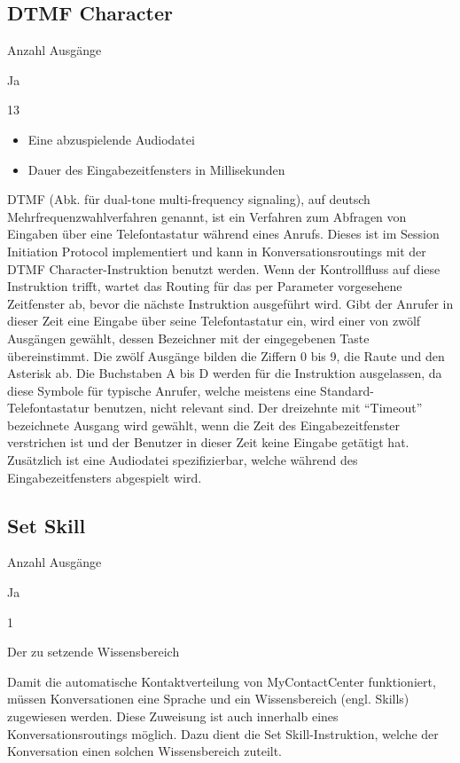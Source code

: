 \subsection{DTMF Character}
\begin{labeling}{Anzahl Ausgänge}
\item [Eingang] Ja
\item [Anzahl Ausgänge] 13
\item [Parameter] \begin{itemize} \item Eine abzuspielende Audiodatei  \item Dauer des Eingabezeitfensters in Millisekunden \end{itemize}
\item [Beschreibung] DTMF (Abk. für dual-tone multi-frequency signaling), auf deutsch Mehrfrequenzwahlverfahren genannt, ist ein Verfahren zum Abfragen von Eingaben über eine Telefontastatur während eines Anrufs. Dieses ist im Session Initiation Protocol implementiert und kann in Konversationsroutings mit der DTMF Character-Instruktion benutzt werden. Wenn der Kontrollfluss auf diese Instruktion trifft, wartet das Routing für das per Parameter vorgesehene Zeitfenster ab, bevor die nächste Instruktion ausgeführt wird. Gibt der Anrufer in dieser Zeit eine Eingabe über seine Telefontastatur ein, wird einer von zwölf Ausgängen gewählt, dessen Bezeichner mit der eingegebenen Taste übereinstimmt. Die zwölf Ausgänge bilden die Ziffern 0 bis 9, die Raute und den Asterisk ab. Die Buchstaben A bis D werden für die Instruktion ausgelassen, da diese Symbole für typische Anrufer, welche meistens eine Standard-Telefontastatur benutzen, nicht relevant sind. Der dreizehnte mit ``Timeout'' bezeichnete Ausgang wird gewählt, wenn die Zeit des Eingabezeitfenster verstrichen ist und der Benutzer in dieser Zeit keine Eingabe getätigt hat. Zusätzlich ist eine Audiodatei spezifizierbar, welche während des Eingabezeitfensters abgespielt wird.  
\end{labeling}

\subsection{Set Skill}
\label{subsec:Set Skill}
\begin{labeling}{Anzahl Ausgänge}
\item [Eingang] Ja
\item [Anzahl Ausgänge] 1
\item [Parameter] Der zu setzende Wissensbereich
\item [Beschreibung] Damit die automatische Kontaktverteilung von MyContactCenter funktioniert, müssen Konversationen eine Sprache und ein Wissensbereich (engl. Skills) zugewiesen werden. Diese Zuweisung ist auch innerhalb eines Konversationsroutings möglich. Dazu dient die Set Skill-Instruktion, welche der Konversation einen solchen Wissensbereich zuteilt.
\end{labeling}

